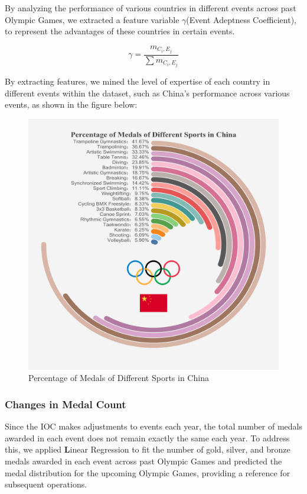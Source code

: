 \documentclass[12pt]{article}  %
\begin{document}
By analyzing the performance of various countries in different events across past Olympic Games, we extracted a feature variable $\gamma$(Event Adeptness Coefficient), to represent the advantages of these countries in certain events.

\begin{equation}
	\gamma = \frac{m_{C_i,E_j}}{\sum m_{C_i,E_j}}
\end{equation}





By extracting features, we mined the level of expertise of each country in different events within the dataset, such as China's performance across various events, as shown in the figure below:

\begin{figure}[htbp]
	\centering
	\includegraphics[width=12cm]{img/Percentage.jpg}
	\caption{Percentage of Medals of Different Sports in China}
	\label{fig:aa}
\end{figure}


\subsubsection{Changes in Medal Count}
Since the IOC makes adjustments to events each year, the total number of medals awarded in each event does not remain exactly the same each year. To address this, we applied \textbf Linear Regression to fit the number of gold, silver, and bronze medals awarded in each event across past Olympic Games and predicted the medal distribution for the upcoming Olympic Games, providing a reference for subsequent operations.
\end{document}
